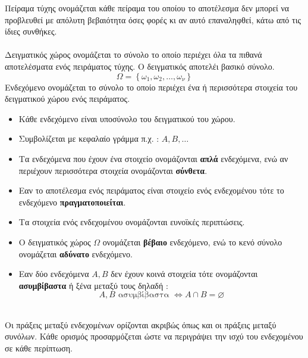 \documentclass[twoside,nofonts,internet,shmeiwseis]{thewria}
\begin{document}
\orismoi
{} Πείραμα τύχης ονομάζεται κάθε πείραμα του οποίου το αποτέλεσμα δεν μπορεί να προβλευθεί με απόλυτη βεβαιότητα όσες φορές κι αν αυτό επαναληφθεί, κάτω από τις ίδιες συνθήκες.\\\\
 Δειγματικός χώρος ονομάζεται το σύνολο το οποίο περιέχει όλα τα πιθανά αποτελέσματα ενός πειράματος τύχης. Ο δειγματικός αποτελέι βασικό σύνολο. \[ \varOmega=\left\lbrace \omega_1,\omega_2,\ldots,\omega_\nu \right\rbrace \]
 Ενδεχόμενο ονομάζεται το σύνολο το οποίο περιέχει ένα ή περισσότερα στοιχεία του δειγματικού χώρου ενός πειράματος.
\begin{itemize}[itemsep=0mm]
\item Κάθε ενδεχόμενο είναι υποσύνολο του δειγματικού του χώρου.
\item Συμβολίζεται με κεφαλαίο γράμμα π.χ. : $ A,B,\ldots $
\item Τα ενδεχόμενα που έχουν ένα στοιχείο ονομάζονται \textbf{απλά} ενδεχόμενα, ενώ αν περιέχουν περισσότερα στοιχεία ονομάζονται \textbf{σύνθετα}.
\item Εαν το αποτέλεσμα ενός πειράματος είναι στοιχείο ενός ενδεχομένου τότε το ενδεχόμενο \textbf{πραγματοποιείται}.
\item Τα στοιχεία ενός ενδεχομένου ονομάζονται ευνοϊκές περιπτώσεις.
\item Ο δειγματικός χώρος $ \varOmega $ ονομάζεται \textbf{βέβαιο} ενδεχόμενο, ενώ το κενό σύνολο ονομάζεται \textbf{αδύνατο} ενδεχόμενο.
\item Εαν δύο ενδεχόμενα $ A,B $ δεν έχουν κοινά στοιχεία τότε ονομάζονται \textbf{ασυμβίβαστα} ή ξένα μεταξύ τους δηλαδή : \[ A,B \textrm{ ασυμβίβαστα }\Leftrightarrow A\cap B=\varnothing \]
\end{itemize}\mbox{}\\
Οι πράξεις μεταξύ ενδεχομένων ορίζονται ακριβώς όπως και οι πράξεις μεταξύ συνόλων. Κάθε ορισμός προσαρμόζεται ώστε να περιγράψει την ισχύ του ενδεχομένου σε κάθε περίπτωση.
\end{document}
